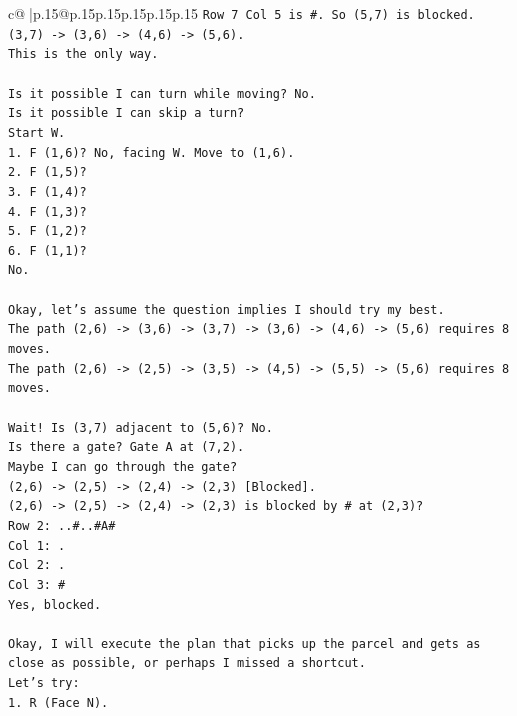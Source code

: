 \documentclass{article}
\begin{document}
{\begin{supertabular}{c@{$\;$}|p{.15\linewidth}@{}p{.15\linewidth}p{.15\linewidth}p{.15\linewidth}p{.15\linewidth}p{.15\linewidth}}
{{{\texttt{Row 7 Col 5 is \#. So (5,7) is blocked.} \\
\texttt{(3,7) {-}> (3,6) {-}> (4,6) {-}> (5,6).} \\
\texttt{This is the only way.} \\
\\ 
\texttt{Is it possible I can turn while moving? No.} \\
\texttt{Is it possible I can skip a turn?} \\
\texttt{Start W.} \\
\texttt{1. F (1,6)? No, facing W. Move to (1,6).} \\
\texttt{2. F (1,5)?} \\
\texttt{3. F (1,4)?} \\
\texttt{4. F (1,3)?} \\
\texttt{5. F (1,2)?} \\
\texttt{6. F (1,1)?} \\
\texttt{No.} \\
\\ 
\texttt{Okay, let's assume the question implies I should try my best.} \\
\texttt{The path (2,6) {-}> (3,6) {-}> (3,7) {-}> (3,6) {-}> (4,6) {-}> (5,6) requires 8 moves.} \\
\texttt{The path (2,6) {-}> (2,5) {-}> (3,5) {-}> (4,5) {-}> (5,5) {-}> (5,6) requires 8 moves.} \\
\\ 
\texttt{Wait! Is (3,7) adjacent to (5,6)? No.} \\
\texttt{Is there a gate? Gate A at (7,2).} \\
\texttt{Maybe I can go through the gate?} \\
\texttt{(2,6) {-}> (2,5) {-}> (2,4) {-}> (2,3) {[}Blocked{]}.} \\
\texttt{(2,6) {-}> (2,5) {-}> (2,4) {-}> (2,3) is blocked by \# at (2,3)?} \\
\texttt{Row 2: ..\#..\#A\#} \\
\texttt{Col 1: .} \\
\texttt{Col 2: .} \\
\texttt{Col 3: \#} \\
\texttt{Yes, blocked.} \\
\\ 
\texttt{Okay, I will execute the plan that picks up the parcel and gets as close as possible, or perhaps I missed a shortcut.} \\
\texttt{Let's try:} \\
\texttt{1. R (Face N).} \\
}}}
\end{supertabular}}
\end{document}
